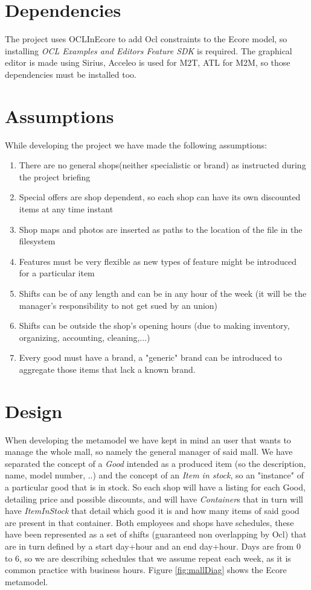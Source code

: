 \documentclass[a4paper]{article}
\begin{document}
\section{Dependencies}
The project uses OCLInEcore to add Ocl constraints to the Ecore model, so installing \textit{OCL Examples and Editors Feature SDK} is required.
The graphical editor is made using Sirius, Acceleo is used for M2T, ATL for M2M, so those dependencies must be installed too.

\section{Assumptions}
While developing the project we have made the following assumptions:
\begin{enumerate}
	\item There are no general shops(neither specialistic or brand) as instructed during the project briefing
	\item Special offers are shop dependent, so each shop can have its own discounted items at any time instant
	\item Shop maps and photos are inserted as paths to the location of the file in the filesystem
	\item Features must be very flexible as new types of feature might be introduced for a particular item
	\item Shifts can be of any length and can be in any hour of the week (it will be the manager's responsibility to not get sued by an union)
	\item Shifts can be outside the shop's opening hours (due to making inventory, organizing, accounting, cleaning,...)
	\item Every good must have a brand, a "generic" brand can be introduced to aggregate those items that lack a known brand.
	
\end{enumerate}

\section{Design}
When developing the metamodel we have kept in mind an user that wants to manage the whole mall, so namely the general manager of said mall.
We have separated the concept of a \textit{Good} intended as a produced item (so the description, name, model number, ..) and the concept of an \textit{Item in stock}, so an "instance" of a particular good that is in stock. So each shop will have a listing for each Good, detailing price and possible discounts, and will have \textit{Container}s that in turn will have \textit{ItemInStock} that detail which good it is and how many items of said good are present in that container. Both employees and shops have schedules, these have been represented as a set of shifts (guaranteed non overlapping by Ocl) that are in turn defined by a start day+hour and an end day+hour. Days are from 0 to 6, so we are describing schedules that we assume repeat each week, as it is common practice with business hours.
Figure \ref{fig:mallDiag} shows the Ecore metamodel.
\end{document}
